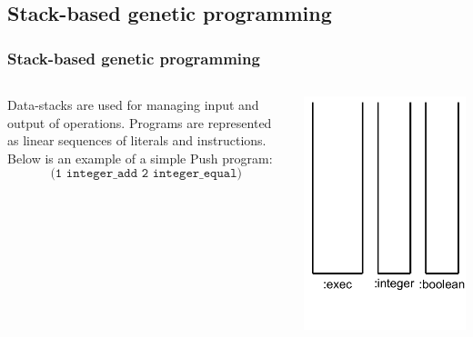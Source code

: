 \documentclass{beamer}
\newcommand{\linespace}{\vskip 0.25cm}
\begin{document}
\subsection{Stack-based genetic programming}
\begin{frame}
	\frametitle{Stack-based genetic programming}
	\begin{columns}
		\begin{column}{0.65\textwidth}
			Data-stacks are used for managing input and output of operations.
			\linespace
			\linespace
			\linespace
			\pause Programs are represented as linear sequences of literals and instructions. Below is an example of a simple Push program:
			\[\texttt{(1 integer\_add 2 integer\_equal)}\]
		\end{column}
	\begin{column}{0.35\textwidth}
		\pause[0] \includegraphics[height=.7\textheight]{Illustrations/empty_stacks.PDF}
	\end{column}
	\end{columns}
\end{frame}
\end{document}

